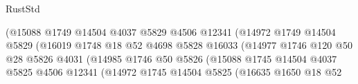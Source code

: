 \begin{lexlean}{RustStd}
\begin{coremodule}
                                              (@15088
                                                @1749
                                                @14504
                                                @4037
                                                @5829
                                                @4506
                                                @12341
                                                (@14972
                                                  @1749
                                                  @14504
                                                  @5829
                                                  (@16019
                                                    @1748
                                                    @18
                                                    @52
                                                    @4698
                                                    @5828
                                                    @16033
                                                    (@14977
                                                      @1746
                                                      @120
                                                      @50
                                                      @28
                                                      @5826
                                                      @4031
                                                      (@14985
                                                        @1746
                                                        @50
                                                        @5826
                                                        (@15088
                                                          @1745
                                                          @14504
                                                          @4037
                                                          @5825
                                                          @4506
                                                          @12341
                                                          (@14972
                                                            @1745
                                                            @14504
                                                            @5825
                                                            (@16635
                                                              @1650
                                                              @18
                                                              @52

\end{coremodule}
\end{lexlean}
